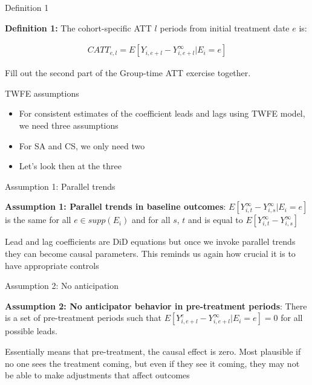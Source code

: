 \documentclass{beamer}
\begin{document}
\begin{frame}{Definition 1}

\textbf{Definition 1:} The cohort-specific ATT $l$ periods from initial treatment date $e$ is:

\begin{eqnarray*}
CATT_{e,l} = E[Y_{i,e+l} - Y^{\infty}_{i,e+l} | E_i=e]
\end{eqnarray*}

\bigskip

Fill out the second part of the Group-time ATT exercise together.

\end{frame}

\begin{frame}{TWFE assumptions}

\begin{itemize}
\item For consistent estimates of the coefficient leads and lags using TWFE model, we need three assumptions
\item For SA and CS, we only need two
\item Let's look then at the three
\end{itemize}

\end{frame}


\begin{frame}{Assumption 1: Parallel trends}

\textbf{Assumption 1: Parallel trends in baseline outcomes}: $E[Y^{\infty}_{i,t} - Y^{\infty}_{i,s} | E_i = e ]$ is the same for all $e \in supp(E_i)$ and for all $s$, $t$ and is equal to $E[Y^{\infty}_{i,t} - Y^{\infty}_{i,s} ]$

\bigskip

Lead and lag coefficients are DiD equations but once we invoke parallel trends they can become causal parameters.  This reminds us again how crucial it is to have  appropriate controls

\end{frame}


\begin{frame}{Assumption 2: No anticipation}

\textbf{Assumption 2: No anticipator behavior in pre-treatment periods}: There is a set of pre-treatment periods such that $E[Y_{i,e+l}^e - Y_{i,e+l}^{\infty} | E_i = e]=0$ for all possible leads.

\bigskip

Essentially means that pre-treatment, the causal effect is zero.  Most plausible if no one sees the treatment coming, but even if they see it coming, they may not be able to make adjustments that affect outcomes

\end{frame}
\end{document}
